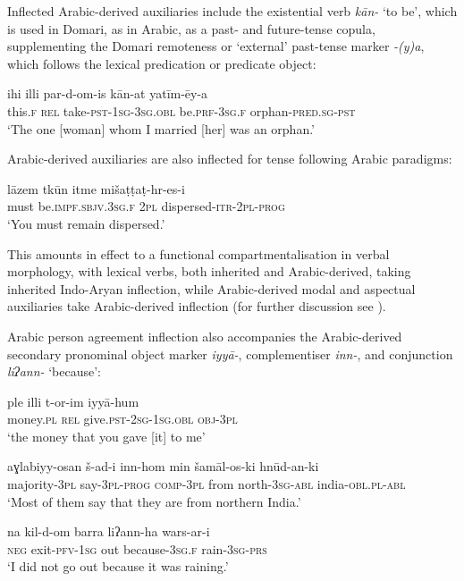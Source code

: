 \documentclass[output=paper]{langsci/langscibook}
\begin{document}
Inflected Arabic-derived auxiliaries include the existential verb \textit{kān-} ‘to be’, which is used in Domari, as in Arabic, as a past- and future-tense copula, supplementing the Domari remoteness or ‘external’ past-tense marker \textit{-(y)a}, which follows the lexical predication or predicate object:

\ea \gll ihi illi par-d-om-is kān-at yatīm-ēy-a\\
     this.\textsc{f} \textsc{rel} take-\textsc{pst-1sg-3sg.obl} be.\textsc{prf-3sg.f} orphan-\textsc{pred.sg-pst}\\
\glt ‘The one [woman] whom I married [her] was an orphan.’ \label{ihi}
\z

Arabic-derived auxiliaries are also inflected for tense following Arabic paradigms:

\ea \gll   lāzem tkūn itme mišaṭṭaṭ-hr-es-i\\
       must be.\textsc{impf.sbjv.3sg.f} \textsc{2pl} dispersed-\textsc{itr-2pl-prog}\\
\glt   ‘You must remain dispersed.’
\z

This amounts in effect to a functional compartmentalisation in verbal morphology, with lexical verbs, both inherited and Arabic-derived, taking inherited Indo-Aryan inflection, while Arabic-derived modal and aspectual auxiliaries take Arabic-derived inflection (for further discussion see \citealt{Matras2015}).

Arabic person agreement inflection also accompanies the Arabic-derived secondary pronominal object marker \textit{iyyā-}, complementiser \textit{inn-}, and conjunction \textit{liʔann-} ‘because’:

\ea \gll   ple illi t-or-im iyyā-hum\\
       money.\textsc{pl} \textsc{rel} give.\textsc{pst-2sg-1sg.obl} \textsc{obj-3pl}\\
\glt   ‘the money that you gave [it] to me’ \label{ple}
\z

\ea\label{most}
\gll aɣlabiyy-osan š-ad-i inn-hom min šamāl-os-ki hnūd-an-ki\\
     majority-\textsc{3pl} say-\textsc{3pl-prog} \textsc{comp-3pl} from        north-\textsc{3sg-abl} india-\textsc{obl.pl-abl}\\
\glt   ‘Most of them say that they are from northern India.’
\z

\ea \gll na kil-d-om barra liʔann-ha wars-ar-i\\
       \textsc{neg} exit-\textsc{pfv-1sg} out because-\textsc{3sg.f} rain-\textsc{3sg-prs}\\
\glt   ‘I did not go out because it was raining.’\label{barra}
\z
\end{document}
